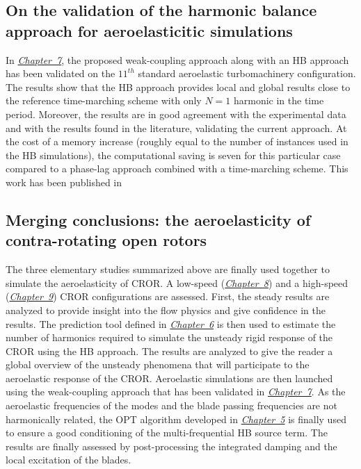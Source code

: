 \subsection*{On the validation of the harmonic balance approach for aeroelasticitic simulations}

In \hyperref[cha:stcf11]{\emph{Chapter~7}}, 
the proposed weak-coupling approach along with
an HB approach has been
validated on the $11^{th}$ standard aeroelastic turbomachinery
configuration.
The results show that the HB approach provides local
and global results close to the reference time-marching scheme 
with only $N=1$ harmonic in the time period. 
Moreover, the results are
in good agreement with the experimental data and with the results
found in the literature, validating the current approach.
At the cost of a memory
increase (roughly equal to the number of instances used in the HB
simulations), the computational saving is seven for this
particular case compared to a phase-lag approach combined
with a time-marching scheme. 
This work has been published in
\begin{quote}
\end{quote}

\subsection*{Merging conclusions: the aeroelasticity of contra-rotating open rotors}

The three elementary studies summarized above 
are finally used together 
to simulate the aeroelasticity
of CROR. A low-speed 
(\hyperref[cha:dream_ls_isolated]{\emph{Chapter~8}})
and a high-speed (\hyperref[cha:dream_hs_isolated]{\emph{Chapter~9}})
CROR configurations are assessed. First,
the steady results are analyzed to provide insight into the flow
physics and give confidence in the results. The prediction tool
defined in \hyperref[cha:limitations_convergence]{\emph{Chapter~6}}
is then used to estimate the number of harmonics required to
simulate the unsteady rigid response of the CROR using the HB approach.
The results are analyzed
to give the reader a global overview of the unsteady phenomena
that will participate to the aeroelastic response of the CROR.
Aeroelastic simulations are then launched using the weak-coupling
approach that has been validated in \hyperref[cha:stcf11]{\emph{Chapter~7}}.
As the aeroelastic frequencies of the modes and the blade passing frequencies
are not harmonically related, the OPT algorithm developed in 
\hyperref[cha:limitations_condition_number]{\emph{Chapter~5}}
is finally used to ensure a good conditioning of the multi-frequential
HB source term. 
The results are finally assessed by post-processing the integrated damping
and the local excitation of the blades.

